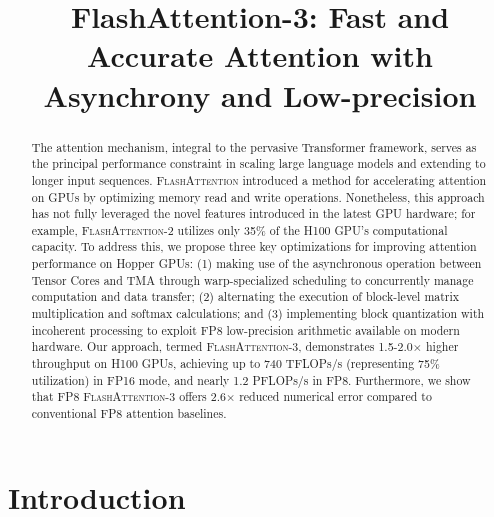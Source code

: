 \title{FlashAttention-3: Fast and Accurate Attention with Asynchrony and Low-precision}

\begin{abstract}
The attention mechanism, integral to the pervasive Transformer framework, serves as the principal performance constraint in scaling large language models and extending to longer input sequences. \textsc{FlashAttention} introduced a method for accelerating attention on GPUs by optimizing memory read and write operations. Nonetheless, this approach has not fully leveraged the novel features introduced in the latest GPU hardware; for example, \textsc{FlashAttention-2} utilizes only 35\% of the H100 GPU’s computational capacity. To address this, we propose three key optimizations for improving attention performance on Hopper GPUs: (1) making use of the asynchronous operation between Tensor Cores and TMA through warp-specialized scheduling to concurrently manage computation and data transfer; (2) alternating the execution of block-level matrix multiplication and softmax calculations; and (3) implementing block quantization with incoherent processing to exploit FP8 low-precision arithmetic available on modern hardware. Our approach, termed \textsc{FlashAttention-3}, demonstrates 1.5-2.0$\times$ higher throughput on H100 GPUs, achieving up to 740 TFLOPs/s (representing 75\% utilization) in FP16 mode, and nearly 1.2 PFLOPs/s in FP8. Furthermore, we show that FP8 \textsc{FlashAttention-3} offers 2.6$\times$ reduced numerical error compared to conventional FP8 attention baselines.
\end{abstract}

\section{Introduction}
\label{sec:intro}

